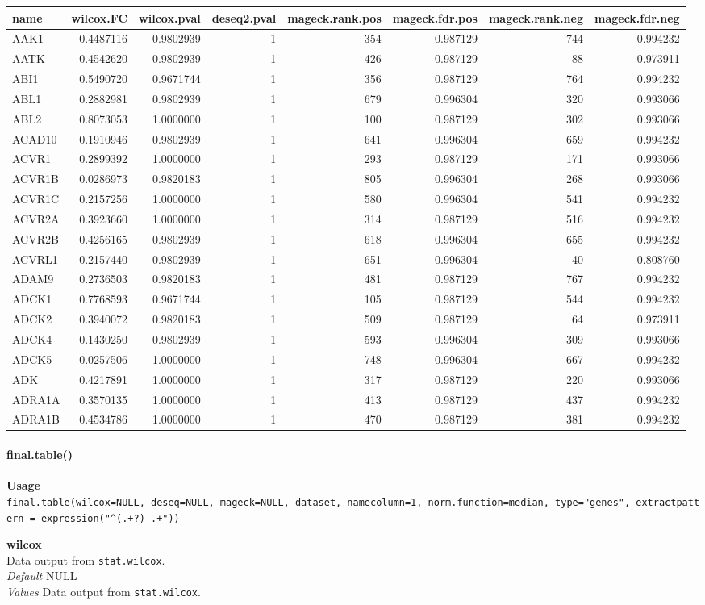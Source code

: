 \documentclass[]{article}
\let\oldparagraph\paragraph
\renewcommand{\paragraph}[1]{\oldparagraph{#1}\mbox{}}
\begin{document}
\begin{longtable}[c]{@{}lrrrrrrr@{}}
\toprule
name & wilcox.FC & wilcox.pval & deseq2.pval & mageck.rank.pos &
mageck.fdr.pos & mageck.rank.neg & mageck.fdr.neg\tabularnewline
\midrule
\endhead
AAK1 & 0.4487116 & 0.9802939 & 1 & 354 & 0.987129 & 744 &
0.994232\tabularnewline
AATK & 0.4542620 & 0.9802939 & 1 & 426 & 0.987129 & 88 &
0.973911\tabularnewline
ABI1 & 0.5490720 & 0.9671744 & 1 & 356 & 0.987129 & 764 &
0.994232\tabularnewline
ABL1 & 0.2882981 & 0.9802939 & 1 & 679 & 0.996304 & 320 &
0.993066\tabularnewline
ABL2 & 0.8073053 & 1.0000000 & 1 & 100 & 0.987129 & 302 &
0.993066\tabularnewline
ACAD10 & 0.1910946 & 0.9802939 & 1 & 641 & 0.996304 & 659 &
0.994232\tabularnewline
ACVR1 & 0.2899392 & 1.0000000 & 1 & 293 & 0.987129 & 171 &
0.993066\tabularnewline
ACVR1B & 0.0286973 & 0.9820183 & 1 & 805 & 0.996304 & 268 &
0.993066\tabularnewline
ACVR1C & 0.2157256 & 1.0000000 & 1 & 580 & 0.996304 & 541 &
0.994232\tabularnewline
ACVR2A & 0.3923660 & 1.0000000 & 1 & 314 & 0.987129 & 516 &
0.994232\tabularnewline
ACVR2B & 0.4256165 & 0.9802939 & 1 & 618 & 0.996304 & 655 &
0.994232\tabularnewline
ACVRL1 & 0.2157440 & 0.9802939 & 1 & 651 & 0.996304 & 40 &
0.808760\tabularnewline
ADAM9 & 0.2736503 & 0.9820183 & 1 & 481 & 0.987129 & 767 &
0.994232\tabularnewline
ADCK1 & 0.7768593 & 0.9671744 & 1 & 105 & 0.987129 & 544 &
0.994232\tabularnewline
ADCK2 & 0.3940072 & 0.9820183 & 1 & 509 & 0.987129 & 64 &
0.973911\tabularnewline
ADCK4 & 0.1430250 & 0.9802939 & 1 & 593 & 0.996304 & 309 &
0.993066\tabularnewline
ADCK5 & 0.0257506 & 1.0000000 & 1 & 748 & 0.996304 & 667 &
0.994232\tabularnewline
ADK & 0.4217891 & 1.0000000 & 1 & 317 & 0.987129 & 220 &
0.993066\tabularnewline
ADRA1A & 0.3570135 & 1.0000000 & 1 & 413 & 0.987129 & 437 &
0.994232\tabularnewline
ADRA1B & 0.4534786 & 1.0000000 & 1 & 470 & 0.987129 & 381 &
0.994232\tabularnewline
\bottomrule
\end{longtable}

\paragraph{final.table()}\label{final.table}

\textbf{Usage}\\
\texttt{final.table(wilcox=NULL,\ deseq=NULL,\ mageck=NULL,\ dataset,\ namecolumn=1,\ norm.function=median,\ type="genes",\ extractpattern\ =\ expression("\^{}(.+?)\_.+"))}

\textbf{wilcox}\\
Data output from \texttt{stat.wilcox}.\\
\emph{Default} NULL\\
\emph{Values} Data output from \texttt{stat.wilcox}.
\end{document}

